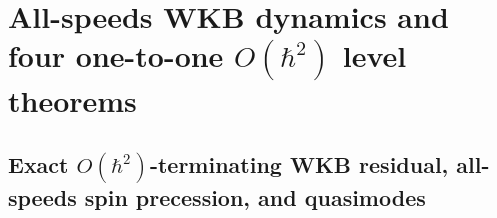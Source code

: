 \documentclass[aps,prd,onecolumn,tightenlines,nofootinbib,notitlepage,10pt,floatfix]{revtex4-2}
\theoremstyle{indentedtheorem}
\begin{document}
\section{All-speeds WKB dynamics and four one-to-one \texorpdfstring{$O(\hbar^2)$}{O(hbar\texttwosuperior)} level theorems}
\label{sec:levels}

\subsection{Exact \texorpdfstring{$O(\hbar^2)$}{O(hbar2)}-terminating WKB residual, all-speeds spin precession, and quasimodes}
\label{sec:wkb_all_speeds}
\end{document}
